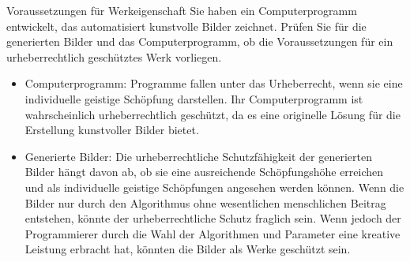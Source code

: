\documentclass{article}
\begin{document}
\begin{exercise}{Voraussetzungen für Werkeigenschaft}
  Sie haben ein Computerprogramm entwickelt, das automatisiert kunstvolle Bilder zeichnet. Prüfen Sie für die generierten Bilder und das Computerprogramm, ob die Voraussetzungen für ein urheberrechtlich geschütztes Werk vorliegen.

  \begin{solution}
    \begin{itemize}
      \item Computerprogramm: Programme fallen unter das Urheberrecht, wenn sie eine individuelle geistige Schöpfung darstellen. Ihr Computerprogramm ist wahrscheinlich urheberrechtlich geschützt, da es eine originelle Lösung für die Erstellung kunstvoller Bilder bietet.
      \item Generierte Bilder: Die urheberrechtliche Schutzfähigkeit der generierten Bilder hängt davon ab, ob sie eine ausreichende Schöpfungshöhe erreichen und als individuelle geistige Schöpfungen angesehen werden können. Wenn die Bilder nur durch den Algorithmus ohne wesentlichen menschlichen Beitrag entstehen, könnte der urheberrechtliche Schutz fraglich sein. Wenn jedoch der Programmierer durch die Wahl der Algorithmen und Parameter eine kreative Leistung erbracht hat, könnten die Bilder als Werke geschützt sein.
    \end{itemize}
  \end{solution}
\end{exercise}
\end{document}

